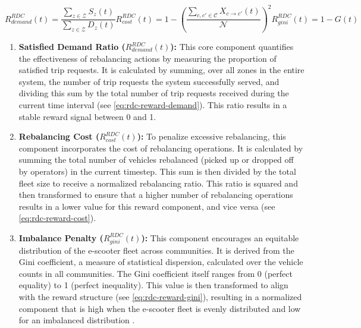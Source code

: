 \begin{subequations}
    \begin{equation}\label{eq:rdc-reward-demand}
        R_{demand}^{RDC}(t) = \frac{\sum_{z \in \mathcal{Z}}S_z(t)}{\sum_{z \in \mathcal{Z}}D_z(t)}
    \end{equation}
    \begin{equation}\label{eq:rdc-reward-cost}
        R_{cost}^{RDC}(t) = 1 -  \left(\frac{\sum_{c, c' \in \mathcal{C}}X_{c \to c'}(t)}{\mathcal{N}}\right)^2
    \end{equation}
    \begin{equation}\label{eq:rdc-reward-gini}
        R_{gini}^{RDC}(t) = 1 - G(t)
    \end{equation}
\end{subequations}

\begin{enumerate}
    \item \textbf{Satisfied Demand Ratio ($R_{demand}^{RDC}(t)$):}
    This core component quantifies the effectiveness of rebalancing actions by measuring the proportion of satisfied trip requests.
    It is calculated by summing, over all zones in the entire system, the number of trip requests the system successfully served, and dividing this sum by the total number of trip requests received during the current time interval (see \autoref{eq:rdc-reward-demand}).
    This ratio results in a stable reward signal between 0 and 1.
    \item \textbf{Rebalancing Cost ($R_{cost}^{RDC}(t)$):}
    To penalize excessive rebalancing, this component incorporates the cost of rebalancing operations.
    It is calculated by summing the total number of vehicles rebalanced (picked up or dropped off by operators) in the current timestep.
    This sum is then divided by the total fleet size to receive a normalized rebalancing ratio.
    This ratio is squared and then transformed to ensure that a higher number of rebalancing operations results in a lower value for this reward component, and vice versa (see \autoref{eq:rdc-reward-cost}).
    \item \textbf{Imbalance Penalty ($R_{gini}^{RDC}(t)$):}
    This component encourages an equitable distribution of the e-scooter fleet across communities.
    It is derived from the Gini coefficient, a measure of statistical dispersion, calculated over the vehicle counts in all communities.
    The Gini coefficient itself ranges from 0 (perfect equality) to 1 (perfect inequality).
    This value is then transformed to align with the reward structure (see \autoref{eq:rdc-reward-gini}), resulting in a normalized component that is high when the e-scooter fleet is evenly distributed and low for an imbalanced distribution \cite{cederle_fairness-oriented_2025}.
\end{enumerate}

